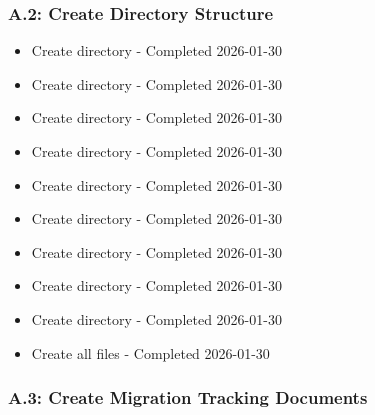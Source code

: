 \subsubsection{A.2: Create Directory Structure}\label{cr:status:pyuvm-migration:a2-create-directory-structure}

\begin{record}

\begin{itemize}
\tightlist
\item[$\boxtimes$]
  Create  directory - Completed 2026-01-30
\item[$\boxtimes$]
  Create  directory - Completed
  2026-01-30
\item[$\boxtimes$]
  Create  directory - Completed
  2026-01-30
\item[$\boxtimes$]
  Create  directory - Completed 2026-01-30
\item[$\boxtimes$]
  Create  directory - Completed 2026-01-30
\item[$\boxtimes$]
  Create  directory - Completed 2026-01-30
\item[$\boxtimes$]
  Create  directory - Completed 2026-01-30
\item[$\boxtimes$]
  Create  directory - Completed 2026-01-30
\item[$\boxtimes$]
  Create  directory - Completed 2026-01-30
\item[$\boxtimes$]
  Create all  files - Completed 2026-01-30
\end{itemize}

\end{record}

\subsubsection{A.3: Create Migration Tracking Documents}\label{cr:status:pyuvm-migration:a3-create-migration-tracking-documents}


